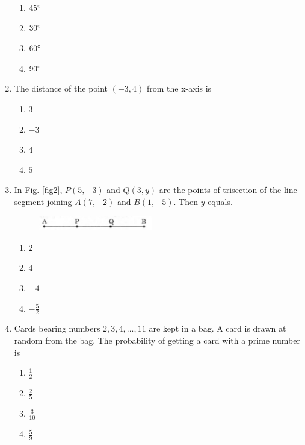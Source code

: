 \documentclass[journal,12pt,twocolumn]{IEEEtran}
\renewcommand\thesection{\arabic{section}}
\begin{document}
\begin{enumerate}[label=\thesection.\arabic*.,ref=\thesection.\theenumi]
\begin{enumerate}
    \item $45\degree$\\
    \item $30\degree$\\
    \item $60\degree$\\
    \item $90\degree$\\
 \end{enumerate}
\item The distance of the point $(-3 , 4)$ from the x-axis is
 \begin{enumerate}
    \item $3$\\
    \item $-3$\\
    \item $4$\\
    \item $5$ \\
 \end{enumerate}
\item In Fig. \ref{fig2}, $P(5, -3)$ and $Q(3, y)$ are the points of trisection of the line segment joining $A(7, -2)$ and $B(1, -5)$. Then $y$ equals.\\

\begin{figure}[h!]
    \centering
    \includegraphics[width=5cm]{2.png}
 \end{figure}
 \begin{enumerate}
  \item $2$\\
  \item $4$ \\
  \item $-4$ \\
  \item $-\frac{5}{2}$
\end{enumerate}
\item Cards bearing numbers $2,3,4, ..., 11$ are kept in a bag. A card is drawn at random from the bag. The probability of getting a card with a prime number is\\
 \begin{enumerate}
     \item $\frac{1}{2}$\\
     \item $\frac{2}{5}$\\
     \item $\frac{3}{10}$\\
     \item $\frac{5}{9}$\\
 \end{enumerate}
\end{enumerate}
\end{document}
